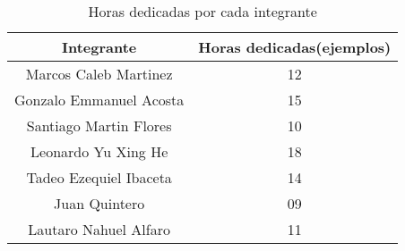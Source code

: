 \begin{table}[H]
    \centering
    \begin{tabular}{|c|c|}
        \hline
        \textbf{Integrante} & \textbf{Horas dedicadas(ejemplos)} \\
        \hline
        Marcos Caleb Martinez & 12 \\ %
        \hline
        Gonzalo Emmanuel Acosta & 15 \\
        \hline
        Santiago Martin Flores & 10 \\
        \hline
        Leonardo Yu Xing He & 18 \\
        \hline
        Tadeo Ezequiel Ibaceta & 14 \\
        \hline
        Juan Quintero & 09 \\
        \hline
        Lautaro Nahuel Alfaro & 11 \\
        \hline
    \end{tabular}
    \caption{Horas dedicadas por cada integrante}
\end{table}
        
